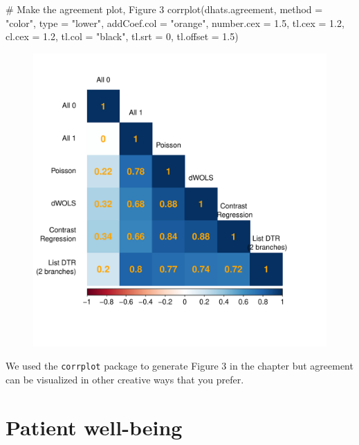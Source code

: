 \documentclass[
  letterpaper,
  DIV=11,
  numbers=noendperiod]{scrreprt}
\newenvironment{Shaded}{\begin{snugshade}}{\end{snugshade}}
\newcommand{\AttributeTok}[1]{\textcolor[rgb]{0.40,0.45,0.13}{#1}}
\newcommand{\CommentTok}[1]{\textcolor[rgb]{0.37,0.37,0.37}{#1}}
\newcommand{\DecValTok}[1]{\textcolor[rgb]{0.68,0.00,0.00}{#1}}
\newcommand{\FloatTok}[1]{\textcolor[rgb]{0.68,0.00,0.00}{#1}}
\newcommand{\FunctionTok}[1]{\textcolor[rgb]{0.28,0.35,0.67}{#1}}
\newcommand{\NormalTok}[1]{\textcolor[rgb]{0.00,0.23,0.31}{#1}}
\newcommand{\StringTok}[1]{\textcolor[rgb]{0.13,0.47,0.30}{#1}}
\begin{document}
\begin{Shaded}
\begin{Highlighting}[]
\CommentTok{\# Make the agreement plot, Figure 3}
\FunctionTok{corrplot}\NormalTok{(dhats.agreement, }\AttributeTok{method =} \StringTok{"color"}\NormalTok{,  }\AttributeTok{type =} \StringTok{"lower"}\NormalTok{,}
         \AttributeTok{addCoef.col =} \StringTok{"orange"}\NormalTok{, }\AttributeTok{number.cex =} \FloatTok{1.5}\NormalTok{,}
         \AttributeTok{tl.cex =} \FloatTok{1.2}\NormalTok{, }\AttributeTok{cl.cex =} \FloatTok{1.2}\NormalTok{, }\AttributeTok{tl.col =} \StringTok{"black"}\NormalTok{, }\AttributeTok{tl.srt =} \DecValTok{0}\NormalTok{, }\AttributeTok{tl.offset =} \FloatTok{1.5}\NormalTok{)}
\end{Highlighting}
\end{Shaded}

\begin{figure}[H]

{\centering \includegraphics{chapter_18_files/figure-pdf/agreement-1.pdf}

}

\end{figure}

We used the \texttt{corrplot} package to generate Figure 3 in the
chapter but agreement can be visualized in other creative ways that you
prefer.

\hypertarget{patient-well-being}{%
\section{Patient well-being}\label{patient-well-being}}
\end{document}

